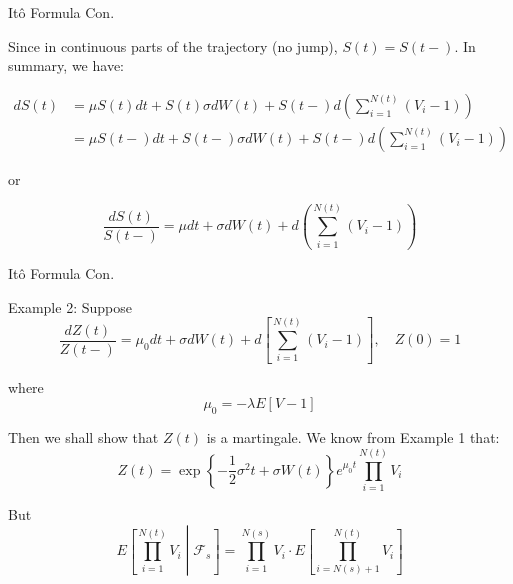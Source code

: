 \documentclass{beamer}
\begin{document}
\begin{frame}{Itô Formula Con.}

    {\footnotesize \footnotesize
    \par Since in continuous parts of the trajectory (no jump), $S(t) = S(t-)$. In summary, we have: 

    \[
    \begin{aligned}
    dS(t) &= \mu S(t)dt + S(t)\sigma dW(t) + S(t-)d \left( \sum_{i=1}^{N(t)} (V_i - 1) \right) \\
    &= \mu S(t-)dt + S(t-)\sigma dW(t) + S(t-)d \left( \sum_{i=1}^{N(t)} (V_i - 1) \right)
    \end{aligned}
    \]

    \par  \pause or

    \[
    \frac{dS(t)}{S(t-)} = \mu dt + \sigma dW(t) + d \left( \sum_{i=1}^{N(t)} (V_i - 1) \right)
    \]
    }
    
\end{frame}


\begin{frame}{Itô Formula Con.}

    {\footnotesize \footnotesize
    \par Example 2: Suppose  
    \[
    \frac{dZ(t)}{Z(t-)} = \mu_0 dt + \sigma dW(t) + d \left[ \sum_{i=1}^{N(t)} (V_i - 1) \right], \quad Z(0) = 1
    \]
    \par where  
    \[
    \mu_0 = -\lambda E[V - 1]
    \]
    \par  \pause Then we shall show that \(Z(t)\) is a martingale. We know from Example 1 that:
    \[
    Z(t) = \exp \left\{ -\frac{1}{2} \sigma^2 t + \sigma W(t) \right\} e^{\mu_0 t} \prod_{i=1}^{N(t)} V_i
    \]
    \par But  
    \[
    E \left[ \prod_{i=1}^{N(t)} V_i \middle| \mathcal{F}_s \right] 
    = \prod_{i=1}^{N(s)} V_i \cdot E \left[ \prod_{i=N(s)+1}^{N(t)} V_i \right]
    \]
    }
    
\end{frame}
\end{document}
